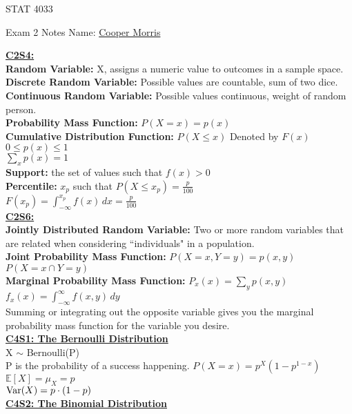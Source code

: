 \documentclass[letter, 12pt]{article}
\begin{document}
\begin{center}
STAT 4033
\end{center}
Exam 2 Notes \hfill Name: \uline{Cooper Morris}
\begin{multicols}{2}
\textbf{\uline{C2S4:}}\\
\textbf{Random Variable:} X, assigns a numeric value to outcomes in a sample space.\\
\textbf{Discrete Random Variable:} Possible values are countable, sum of two dice.\\
\textbf{Continuous Random Variable:} Possible values continuous, weight of random person.\\
\textbf{Probability Mass Function:} \(P(X=x) = p(x)\) \\
\textbf{Cumulative Distribution Function:} \(P(X\leq x) \) Denoted by \(F(x)\) \\
\(0\leq p(x) \leq 1\)\\
\(\sum_xp(x) = 1\)\\
\textbf{Support:} the set of values such that \(f(x) > 0	\)\\
\textbf{Percentile:} \(x_p\) such that \(P(X\leq x_p) = \frac{p}{100}\)\\
\(F(x_p) = \int_{-\infty}^{x_p} f(x)\,dx = \frac{p}{100}\)\\
\textbf{\uline{C2S6:}}\\
\textbf{Jointly Distributed Random Variable:} Two or more random variables that are related when considering ``individuals" in a population.\\
\textbf{Joint Probability Mass Function:} \(P(X=x, Y=y) = p(x,y)\) \(P(X=x \cap Y=y)\) \\
\textbf{Marginal Probability Mass Function:} \(P_x(x) = \sum_y p(x,y)\)\\
\(f_x(x) = \int_{-\infty}^\infty f(x,y)\,dy\)\\
Summing or integrating out the opposite variable gives you the marginal probability mass function for the variable you desire.\\
\textbf{\uline{C4S1: The Bernoulli Distribution}}\\
X \(\sim\) Bernoulli(P)\\
P is the probability of a success happening. 
\(P(X=x) = p^X(1-p^{1-x})\)\\
\(\mathds{E}[X] = \mu_X = p\)\\
\(\textnormal{Var}(X) = p\cdot(1-p)\)\\
\textbf{\uline{C4S2: The Binomial Distribution}}\\

\end{multicols}
\end{document}
